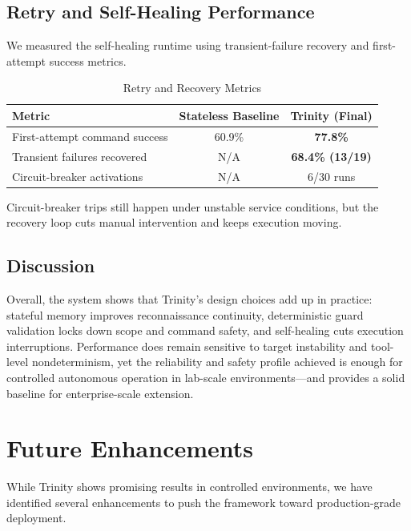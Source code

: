 \documentclass[conference]{IEEEtran}
\begin{document}
\subsection{Retry and Self-Healing Performance}

We measured the self-healing runtime using transient-failure recovery and first-attempt success metrics.

\begin{table}[h]
\centering
\caption{Retry and Recovery Metrics}
\label{tab:final_retry}
\begin{tabular}{lcc}
\toprule
\textbf{Metric} & \textbf{Stateless Baseline} & \textbf{Trinity (Final)} \\
\midrule
First-attempt command success & 60.9\% & \textbf{77.8\%} \\
Transient failures recovered & N/A & \textbf{68.4\% (13/19)} \\
Circuit-breaker activations & N/A & 6/30 runs \\
\bottomrule
\end{tabular}
\end{table}

Circuit-breaker trips still happen under unstable service conditions, but the recovery loop cuts manual intervention and keeps execution moving.

\subsection{Discussion}

Overall, the system shows that Trinity's design choices add up in practice: stateful memory improves reconnaissance continuity, deterministic guard validation locks down scope and command safety, and self-healing cuts execution interruptions. Performance does remain sensitive to target instability and tool-level nondeterminism, yet the reliability and safety profile achieved is enough for controlled autonomous operation in lab-scale environments---and provides a solid baseline for enterprise-scale extension.

\section{Future Enhancements}
\label{sec:future}

While Trinity shows promising results in controlled environments, we have identified several enhancements to push the framework toward production-grade deployment.
\end{document}
